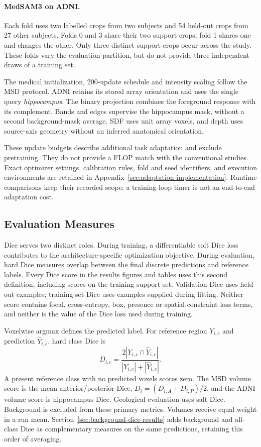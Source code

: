 \documentclass[12pt,a4paper]{article}
\begin{document}
\paragraph{MedSAM3 on ADNI.}\label{sec:medsam-adni-methods}
Each fold uses two labelled crops from two subjects and 54 held-out
crops from 27 other subjects. Folds 0 and 3 share their two support
crops; fold 1 shares one and changes the other. Only three distinct
support crops occur across the study. These folds vary the evaluation
partition, but do not provide three independent draws of a training set.

The medical initialization, 200-update schedule and intensity scaling
follow the MSD protocol. ADNI retains its stored array orientation and
uses the single query \emph{hippocampus}. The binary projection combines
the foreground response with its complement. Bands and edges supervise
the hippocampus mask, without a second background-mask average.
SDF uses unit array voxels, and depth uses source-axis geometry without
an inferred anatomical orientation.

These update budgets describe additional task adaptation and exclude
pretraining. They do not provide a FLOP match with the conventional
studies. Exact optimizer settings, calibration rules, fold and seed
identifiers, and execution environments are retained in
Appendix~\ref{sec:adaptation-implementation}. Runtime comparisons keep
their recorded scope; a training-loop timer is not an end-to-end
adaptation cost.

\subsection{Evaluation Measures}
\label{sec:evaluation-methods}

Dice serves two distinct roles. During training, a differentiable soft
Dice loss contributes to the architecture-specific optimization
objective. During evaluation, hard Dice measures overlap between the
final discrete predictions and reference labels. Every Dice score in
the results figures and tables uses this second definition, including scores on the
training support set. Validation Dice uses held-out examples;
training-set Dice uses examples supplied during fitting. Neither score
contains focal, cross-entropy, box, presence or spatial-constraint loss
terms, and neither is the value of the Dice loss used during training.

Voxelwise argmax defines the predicted label. For reference region
$Y_{i,c}$ and prediction $\widehat Y_{i,c}$, hard class Dice is
\begin{equation}
 D_{i,c}=\frac{2|Y_{i,c}\cap\widehat Y_{i,c}|}
 {|Y_{i,c}|+|\widehat Y_{i,c}|}.
\label{eq:reported-hard-dice}
\end{equation}
A present reference class with no predicted voxels scores zero.
The MSD volume score is the mean anterior/posterior Dice,
$D_i=(D_{i,A}+D_{i,P})/2$, and the ADNI volume score is hippocampus Dice. Geological evaluation
uses salt Dice.
Background is excluded from these primary metrics. Volumes receive
equal weight in a run mean. Section~\ref{sec:background-dice-results}
adds background and all-class Dice as complementary measures on
the same predictions, retaining this order of averaging.
\end{document}
